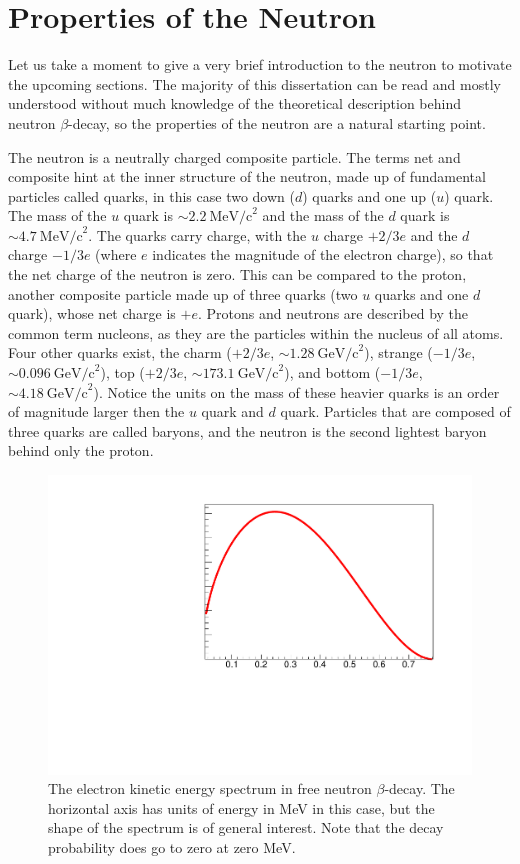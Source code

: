 \section{Properties of the Neutron}
\label{sec:neutronProperties}
Let us take a moment to give a very brief introduction to the neutron to motivate the
upcoming sections. The majority of this dissertation can be read and mostly understood
without much knowledge of the theoretical description behind neutron $\beta$-decay,
so the properties of the neutron are a natural starting point.

The neutron is a neutrally charged composite particle. The terms net and
composite hint at the inner structure of the neutron, made up of fundamental
particles called quarks, in this case two down ($d$) quarks and one up ($u$) quark.
The mass of the $u$ quark is $\sim2.2~\mathrm{MeV/c}^2$ and the mass of the
$d$ quark is $\sim4.7~\mathrm{MeV/c}^2$.
The quarks carry charge, with the $u$ charge $+2/3e$ and the $d$ charge
$-1/3e$ (where $e$ indicates the magnitude of the electron charge),
so that the net charge of the neutron is zero. This can be compared
to the proton, another composite particle made up of three quarks (two $u$ quarks and
one $d$ quark), whose net charge is $+e$. Protons and neutrons are described
by the common term nucleons, as they are the particles within the nucleus of all
atoms. Four other quarks exist, 
the charm ($+2/3e$, $\sim1.28~\mathrm{GeV/c}^2$), strange ($-1/3e$, $\sim0.096~\mathrm{GeV/c}^2$),
top ($+2/3e$, $\sim173.1~\mathrm{GeV/c}^2$), and  bottom ($-1/3e$, $\sim4.18~\mathrm{GeV/c}^2$). Notice
the units on the mass of these heavier quarks is an order of magnitude larger then the $u$ quark and $d$ quark.
Particles that are composed of three quarks are called baryons, and the neutron
is the second lightest baryon
behind only the proton.

\begin{figure}
  \centering
  \includegraphics[page=1,scale=0.4]{1-Introduction/betaSpectrum.pdf}
    \caption{The electron kinetic energy spectrum in free neutron $\beta$-decay. The horizontal
      axis has units of energy in MeV in this case, but the shape of the spectrum
      is of general interest. Note that the decay probability does go to zero at zero
      MeV.}
  \label{fig:betaSpectrum}
\end{figure}

